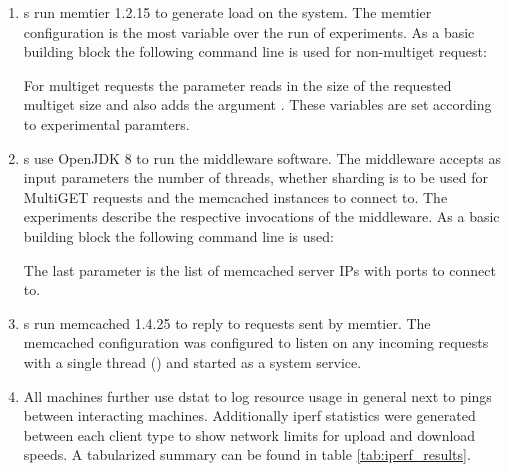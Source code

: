         \begin{enumerate}
            \item \cli{}s run memtier 1.2.15 %
                  to generate load on the system.
                  The memtier configuration is the most variable over the run of experiments. As a basic building
                  block the following command line is used for non-multiget request:

                  For multiget requests the  parameter reads in the size of the requested multiget
                  size and also adds the argument . These variables are set
                  according to experimental paramters.

            \item \mw{}s use OpenJDK 8 to run the middleware software.
                  The middleware accepts as input parameters the number of threads, whether sharding is to be used
                  for MultiGET requests and the memcached instances to connect to. The experiments describe the
                  respective invocations of the middleware. As a basic building block the following command line is
                  used:

                   The last parameter is the list of memcached server IPs with ports to connect to.

            \item \srv{}s run memcached 1.4.25 to reply to requests sent by memtier.
                  The memcached configuration was configured to listen on any incoming requests with a single thread
                  () and started as a system service.

            \item All machines further use dstat to log resource usage in general next to pings between interacting
                  machines. Additionally iperf statistics were generated between each client type to show network
                  limits for upload and download speeds. A tabularized summary can be found in table
                  \ref{tab:iperf_results}.
        \end{enumerate}

